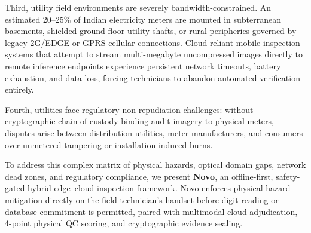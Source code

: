 \documentclass[conference]{IEEEtran}
\begin{document}
Third, utility field environments are severely bandwidth-constrained. An estimated 20--25\% of Indian electricity meters are mounted in subterranean basements, shielded ground-floor utility shafts, or rural peripheries governed by legacy 2G/EDGE or GPRS cellular connections. Cloud-reliant mobile inspection systems that attempt to stream multi-megabyte uncompressed images directly to remote inference endpoints experience persistent network timeouts, battery exhaustion, and data loss, forcing technicians to abandon automated verification entirely.

Fourth, utilities face regulatory non-repudiation challenges: without cryptographic chain-of-custody binding audit imagery to physical meters, disputes arise between distribution utilities, meter manufacturers, and consumers over unmetered tampering or installation-induced burns.

To address this complex matrix of physical hazards, optical domain gaps, network dead zones, and regulatory compliance, we present \textbf{Novo}, an offline-first, safety-gated hybrid edge--cloud inspection framework. Novo enforces physical hazard mitigation directly on the field technician's handset before digit reading or database commitment is permitted, paired with multimodal cloud adjudication, 4-point physical QC scoring, and cryptographic evidence sealing.
\end{document}
